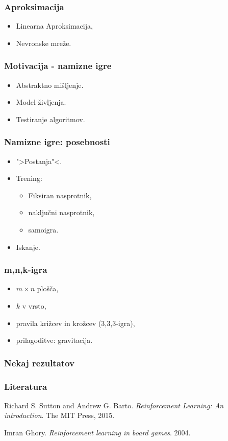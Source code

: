 \documentclass{beamer}    %
\begin{document}
\begin{frame}
    \frametitle{Aproksimacija}
    \begin{itemize}
        \item Linearna Aproksimacija, 
        \item Nevronske mreže.
    \end{itemize}
\end{frame}


\begin{frame}
    \frametitle{Motivacija - namizne igre}
    \begin{itemize}
        \item Abstraktno mišljenje.
        \item Model življenja.
        \item Testiranje algoritmov.
    \end{itemize}
\end{frame}


\begin{frame}
    \frametitle{Namizne igre: posebnosti}
    \begin{itemize}
        \item ">Postanja"<. 
        \item Trening: 
                \begin{itemize}
                    \item Fiksiran nasprotnik, 
                    \item naključni nasprotnik,
                    \item samoigra.
                \end{itemize}
        \item Iskanje.
    \end{itemize}
\end{frame}


\begin{frame}
    \frametitle{m,n,k-igra}
    \begin{itemize}
        \item $m \times n$ plošča, 
        \item $k$ v vrsto, 
        \item pravila križcev in krožcev (3,3,3-igra),
        \item prilagoditve: gravitacija.
    \end{itemize}
\end{frame}


\begin{frame}
    \frametitle{Nekaj rezultatov}
\end{frame}


\begin{frame}
    \frametitle{Literatura}
    \begin{thebibliography}{9}
        Richard S. Sutton and Andrew G. Barto. 
    \textit{Reinforcement Learning: An introduction}.
    The MIT Press, 
    2015.

    \medskip
    \medskip

    Imran Ghory.
    \textit{Reinforcement learning in board games}.
    2004.

    \end{thebibliography}
\end{frame}
\end{document}
